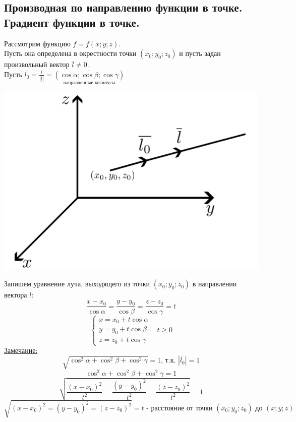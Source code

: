\documentclass[12pt]{article}
\let\ORIincludegraphics\includegraphics
\renewcommand{\includegraphics}[2][]{\ORIincludegraphics[scale=0.65,#1]{#2}}
\begin{document}
    \subsection{Производная по направлению функции в точке. Градиент функции в точке.}\noindent
    Рассмотрим функцию $f = f(x; y; z)$.\\
    Пусть она определена в окрестности точки $(x_0; y_0; z_0)$ и пусть задан произвольный вектор $\overline{l} \ne 0$.\\
    Пусть $\overline{l_0} = \frac{\overline{l}}{|\overline{l}|} = \underset{\text{направленные косинусы}}{\left( \overline{\cos \alpha; \cos \beta; \cos \gamma} \right)}$
    \begin{center}
        \includegraphics{7.10.1.png}
    \end{center}
    Запишем уравнение луча, выходящего из точки $(x_0; y_0; z_0)$ в направлении вектора $l$:
    \[ \frac{x - x_0}{\cos \alpha} = \frac{y - y_0}{\cos \beta} = \frac{z - z_0}{\cos \gamma} = t \]
    \[ \begin{cases}
        x = x_0 + t\cos \alpha\\
        y = y_0 + t\cos \beta\\
        z = z_0 + t\cos \gamma
    \end{cases}\,\,\,\,\, t \ge 0 \]
    \underline{Замечание:}
    \[ \sqrt{\cos^2 \alpha + \cos^2 \beta + \cos^2 \gamma} = 1\text{, т.к. } |\overline{l_0}| = 1 \]
    \[ \cos^2 \alpha + \cos^2 \beta + \cos^2 \gamma = 1\]
    \[ \sqrt{\frac{(x - x_0)^2}{t^2} = \frac{(y - y_0)^2}{t^2} = \frac{(z - z_0)^2}{t^2}} = 1 \]
    \[ \sqrt{(x - x_0)^2 = (y - y_0)^2 = (z - z_0)^2} = t\text{ - расстояние от точки } (x_0; y_0; z_0) \text{ до } (x; y; z) \]
\end{document}
